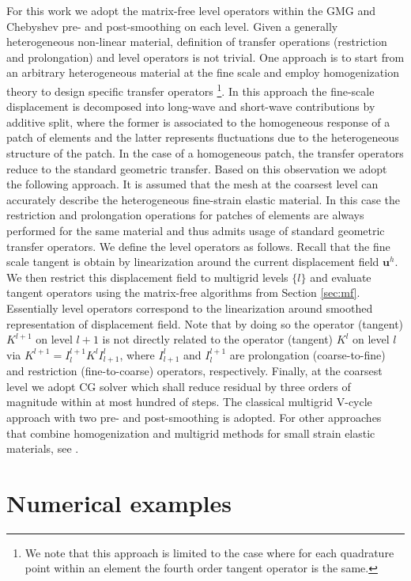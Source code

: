 \documentclass[preprint,12pt,times]{elsarticle}
\def\gz  #1{           \mbox{$\boldsymbol{#1}$}}
\begin{document}
For this work we adopt the matrix-free level operators within the GMG and Chebyshev pre- and post-smoothing on each level. Given a generally heterogeneous non-linear material, definition of transfer operations (restriction and prolongation) and level operators is not trivial. One approach is to start from an arbitrary heterogeneous material at the fine scale and employ homogenization theory \cite{Suquet1985, Hill1972,Hashin1983,Castaneda1997} to design specific transfer operators \cite{Miehe2007}\footnote{
  We note that this approach is limited to the case where for each quadrature point within an element the fourth order tangent operator is the same.
}.
In this approach the fine-scale displacement is decomposed into long-wave and short-wave contributions by additive split, where the former is associated to the homogeneous response of a patch of elements and the latter represents fluctuations due to the heterogeneous structure of the patch. In the case of a homogeneous patch, the transfer operators reduce to the standard geometric transfer. Based on this observation we adopt the following approach. It is assumed that the mesh at the coarsest level can accurately describe the heterogeneous fine-strain elastic material. In this case the restriction and prolongation operations for patches of elements are always performed for the same material and thus admits usage of standard geometric transfer operators. We define the level operators as follows. Recall that the fine scale tangent is obtain by linearization around the current displacement field $\gz u^h$. We then restrict this displacement field to multigrid levels $\{l\}$ and evaluate tangent operators using the matrix-free algorithms from Section \ref{sec:mf}. Essentially level operators correspond to the linearization around smoothed representation of displacement field.
Note that by doing so the operator (tangent) $K^{l+1}$ on level $l+1$ is not directly related to the operator (tangent) $K^{l}$ on level $l$ via $K^{l+1}=I^{l+1}_{l}  K^l I^l_{l+1}$, where $I^l_{l+1}$ and $I^{l+1}_l$ are prolongation (coarse-to-fine) and restriction (fine-to-coarse) operators, respectively.
Finally, at the coarsest level we adopt CG solver which shall reduce residual by three orders of magnitude within at most hundred of steps.
The classical multigrid V-cycle approach with two pre- and post-smoothing is adopted. For other approaches that combine homogenization and multigrid methods for small strain elastic materials, see \cite{Bayreuther2003,Fish1995}.

\section{Numerical examples}
\label{sec:example}
\end{document}
